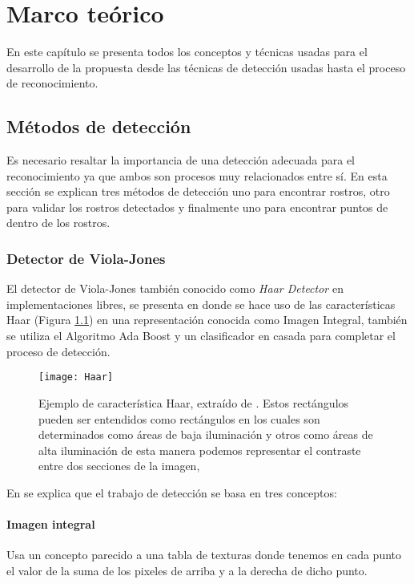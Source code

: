 \chapter{Marco teórico}\label{chap:Conceptos}
En este capítulo se presenta todos los conceptos y técnicas usadas para el desarrollo de la propuesta desde las técnicas de detección usadas hasta el proceso de reconocimiento.

\section{Métodos de detección}

Es necesario resaltar la importancia de una detección adecuada para el reconocimiento ya que ambos son procesos muy relacionados entre sí. En esta sección se explican tres métodos de detección uno para encontrar rostros, otro para validar los rostros detectados y finalmente uno para encontrar puntos de dentro de los rostros.


\subsection{Detector de Viola-Jones}\label{scc:Viola}
El detector de Viola-Jones también conocido como \textit{Haar Detector} en implementaciones libres, se presenta en \cite{viola2001rapid} donde se hace uso de las características Haar (Figura \ref{im:Haar}) en una representación conocida como Imagen Integral, también se utiliza el Algoritmo Ada Boost y un clasificador en casada para completar el proceso de detección.

\begin{figure}[h]
\center
\texttt{[image: Haar]}
\caption{Ejemplo de característica Haar, extraído de \cite{viola2001rapid}. Estos rectángulos pueden ser entendidos como rectángulos en los cuales son determinados como áreas de baja iluminación y otros como áreas de alta iluminación de esta manera podemos representar el contraste entre dos secciones de la imagen,}
\label{im:Haar}
\end{figure}

En \cite{viola2001rapid} se explica que el trabajo de detección se basa en tres conceptos:
\subsubsection{Imagen integral}
Usa un concepto parecido a una tabla de texturas donde tenemos en cada punto el valor de la suma de los pixeles de arriba y a la derecha de dicho punto. 

